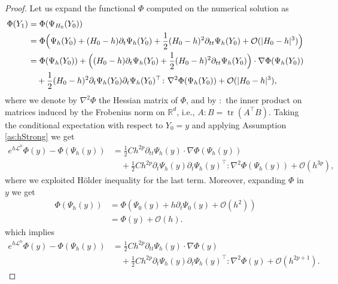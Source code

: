 \documentclass{siamart1116}
\numberwithin{theorem}{section}
\DeclarePairedDelimiter{\abs}{\lvert}{\rvert}
\newcommand{\R}{\mathbb{R}}
\newcommand{\OO}{\mathcal{O}}
\newcommand{\diffL}{\mathcal{L}}
\newcommand{\trace}{\operatorname{tr}}
\begin{document}
\begin{proof} Let us expand the functional $\Phi$ computed on the numerical solution as
	\begin{equation}
		\begin{aligned}
			\Phi(Y_1) &= \Phi(\Psi_{H_0}(Y_0)) \\
			&= \Phi\Big(\Psi_h(Y_0) + (H_0-h)\partial_t\Psi_h(Y_0) + \frac{1}{2}(H_0-h)^2\partial_{tt}\Psi_h(Y_0) + \OO(\abs{H_0 - h}^3)\Big)\\
			&= \Phi(\Psi_h(Y_0)) + \Big((H_0 - h)\partial_t\Psi_h(Y_0)+\frac{1}{2}(H_0-h)^2\partial_{tt}\Psi_h(Y_0)\Big) \cdot \nabla\Phi(\Psi_h(Y_0))\\
			&\quad + \frac{1}{2}(H_0 - h)^2 \partial_t \Psi_h(Y_0) \partial_t \Psi_h(Y_0)^\top  \colon \nabla^2\Phi(\Psi_h(Y_0)) + \OO(\abs{H_0 - h}^3),
		\end{aligned}
	\end{equation}
	where we denote by $\nabla^2\Phi$ the Hessian matrix of $\Phi$, and by $\colon$ the inner product on matrices induced by the Frobenius norm on $\R^d$, i.e., $A\colon B = \trace(A^\top B)$. Taking the conditional expectation with respect to $Y_0 = y$ and applying Assumption \ref{as:hStrong} we get
	\begin{equation}
		\begin{aligned}
			e^{h\diffL^h}\Phi(y) - \Phi(\Psi_h(y)) &= \frac{1}{2} Ch^{2p}\partial_{tt}\Psi_h(y)\cdot \nabla\Phi(\Psi_h(y))\\
			&\quad + \frac{1}{2} Ch^{2p}\partial_t \Psi_h(y) \partial_t \Psi_h(y)^\top  \colon \nabla^2\Phi(\Psi_h(y)) + \OO(h^{3p}),
		\end{aligned}
	\end{equation}
	where we exploited Hölder inequality for the last term. Moreover, expanding $\Phi$ in $y$ we get
	\begin{equation}
		\begin{aligned}
			\Phi(\Psi_h(y)) &= \Phi\left(\Psi_0(y) + h\partial_t \Psi_0(y) + \OO(h^2)\right) \\
			&= \Phi(y) + \OO(h).
		\end{aligned}
	\end{equation}
	which implies
	\begin{equation}\label{eq:DistanceProbDet}
		\begin{aligned}
			e^{h\diffL^h}\Phi(y) - \Phi(\Psi_h(y)) &= \frac{1}{2} Ch^{2p}\partial_{tt}\Psi_h(y) \cdot \nabla\Phi(y)\\
			&\quad +\frac{1}{2}Ch^{2p}\partial_t \Psi_h(y) \partial_t \Psi_h(y)^\top  \colon \nabla^2\Phi(y) + \OO(h^{2p+1}).

\end{aligned}
\end{equation}
\end{proof}
\end{document}
